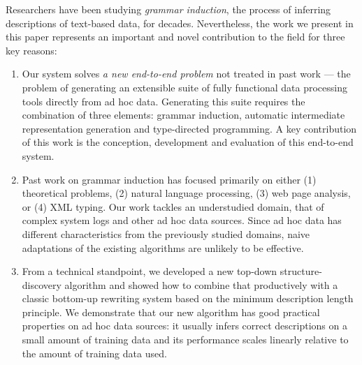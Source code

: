 Researchers have been studying {\em grammar induction}, the process of
inferring descriptions of text-based data, for decades.  Nevertheless,
the work we present in this paper represents an important and novel 
contribution to the field for three key reasons:

\begin{enumerate}
\item Our system solves {\em a new end-to-end problem} not treated in
past work --- the problem of generating an extensible suite of fully
functional data processing tools directly from ad hoc data.  
Generating this suite requires the combination of three elements:
grammar induction, automatic intermediate representation generation
and type-directed programming.  A key contribution of this work is the
conception, development and evaluation of this end-to-end system.


\item Past work on grammar induction has focused primarily on
either (1) theoretical problems, (2) natural language processing, 
(3) web page analysis, or
(4) XML typing.  Our work tackles an understudied domain, that of complex system
logs and other ad hoc data sources.  Since ad hoc data has
different characteristics from the previously studied domains, naive
adaptations of the existing algorithms are unlikely to be %
effective.  

\item  From a technical standpoint, we developed a new top-down 
structure-discovery algorithm and showed how to combine that 
productively with a classic bottom-up rewriting system based on 
the minimum description length principle. We demonstrate that our
new algorithm has good practical properties on ad hoc data sources:  
it usually infers correct descriptions on a small amount of training
data and its performance scales linearly relative to the amount of training
data used.
\end{enumerate}

